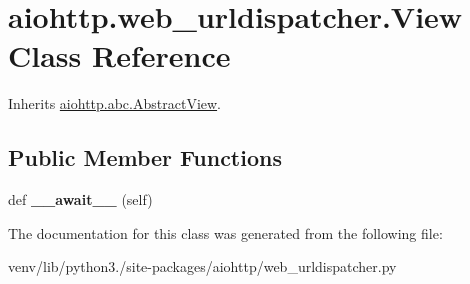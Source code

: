 \hypertarget{classaiohttp_1_1web__urldispatcher_1_1_view}{}\section{aiohttp.\+web\+\_\+urldispatcher.\+View Class Reference}
\label{classaiohttp_1_1web__urldispatcher_1_1_view}


Inherits \hyperlink{classaiohttp_1_1abc_1_1_abstract_view}{aiohttp.\+abc.\+Abstract\+View}.

\subsection*{Public Member Functions}
\begin{DoxyCompactItemize}
\item 
\mbox{\label{classaiohttp_1_1web__urldispatcher_1_1_view_ad3ce064d3715dd00d0fa1761693783d6}} 
def {\bfseries \+\_\+\+\_\+await\+\_\+\+\_\+} (self)
\end{DoxyCompactItemize}


The documentation for this class was generated from the following file\+:\begin{DoxyCompactItemize}
\item 
venv/lib/python3./site-\/packages/aiohttp/web\+\_\+urldispatcher.\+py\end{DoxyCompactItemize}
